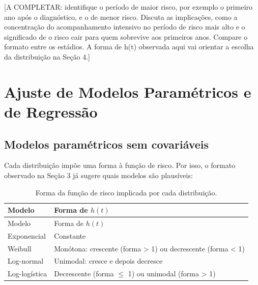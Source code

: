 \documentclass[
  brazilian,
]{article}
\begin{document}
{[}A COMPLETAR: identifique o período de maior risco, por exemplo o
primeiro ano após o diagnóstico, e o de menor risco. Discuta as
implicações, como a concentração do acompanhamento intensivo no período
de risco mais alto e o significado de o risco cair para quem sobrevive
aos primeiros anos. Compare o formato entre os estádios. A forma de h(t)
observada aqui vai orientar a escolha da distribuição na Seção 4.{]}

\section{Ajuste de Modelos Paramétricos e de
Regressão}\label{ajuste-de-modelos-paramuxe9tricos-e-de-regressuxe3o}

\subsection{Modelos paramétricos sem
covariáveis}\label{modelos-paramuxe9tricos-sem-covariuxe1veis}

Cada distribuição impõe uma forma à função de risco. Por isso, o formato
observado na Seção 3 já sugere quais modelos são plausíveis:

\begin{longtable}[]{@{}
  >{\raggedright\arraybackslash}p{}
  >{\raggedright\arraybackslash}p{}@{}}
\caption{Forma da função de risco implicada por cada
distribuição.}\tabularnewline
\toprule\noalign{}
\begin{minipage}[b]{\linewidth}\raggedright
Modelo
\end{minipage} & \begin{minipage}[b]{\linewidth}\raggedright
Forma de \(h(t)\)
\end{minipage} \\
\midrule\noalign{}
\endfirsthead
\toprule\noalign{}
\begin{minipage}[b]{\linewidth}\raggedright
Modelo
\end{minipage} & \begin{minipage}[b]{\linewidth}\raggedright
Forma de \(h(t)\)
\end{minipage} \\
\midrule\noalign{}
\endhead
\bottomrule\noalign{}
\endlastfoot
Exponencial & Constante \\
Weibull & Monótona: crescente (forma \textgreater{} 1) ou decrescente
(forma \textless{} 1) \\
Log-normal & Unimodal: cresce e depois decresce \\
Log-logística & Decrescente (forma \(\leq\) 1) ou unimodal (forma
\textgreater{} 1) \\
\end{longtable}
\end{document}
